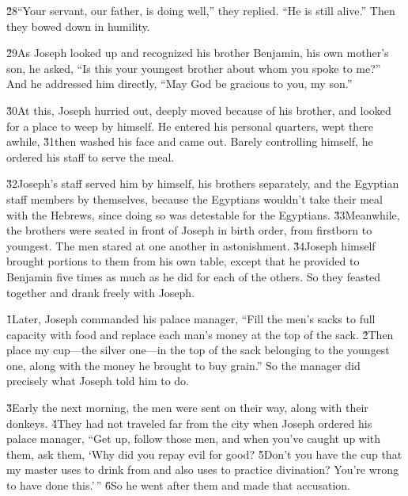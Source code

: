 \v{28}``Your servant, our father, is doing well,'' they replied. ``He is still alive.'' Then they bowed down in humility.

\v{29}As Joseph looked up and recognized his brother Benjamin, his own mother's son, he asked, ``Is this your youngest brother about whom you spoke to me?'' And he addressed him directly, ``May God be gracious to you, my son.''

\v{30}At this, Joseph hurried out, deeply moved because of his brother, and looked for a place to weep by himself. He entered his personal quarters, wept there awhile, \v{31}then washed his face and came out. Barely controlling himself, he ordered his staff to serve the meal.

\v{32}Joseph's staff served him by himself, his brothers separately, and the Egyptian staff members by themselves, because the Egyptians wouldn't take their meal with the Hebrews, since doing so was detestable for the Egyptians. \v{33}Meanwhile, the brothers were seated in front of Joseph in birth order, from firstborn to youngest. The men stared at one another in astonishment. \v{34}Joseph himself brought portions to them from his own table, except that he provided to Benjamin five times as much as he did for each of the others. So they feasted together and drank freely with Joseph.

\v{1}Later, Joseph commanded his palace manager, ``Fill the men's sacks to full capacity with food and replace each man's money at the top of the sack. \v{2}Then place my cup---the silver one---in the top of the sack belonging to the youngest one, along with the money he brought to buy grain.'' So the manager did precisely what Joseph told him to do.

\v{3}Early the next morning, the men were sent on their way, along with their donkeys. \v{4}They had not traveled far from the city when Joseph ordered his palace manager, ``Get up, follow those men, and when you've caught up with them, ask them, `Why did you repay evil for good? \v{5}Don't you have the cup that my master uses to drink from and also uses to practice divination? You're wrong to have done this.'\,'' \v{6}So he went after them and made that accusation.

